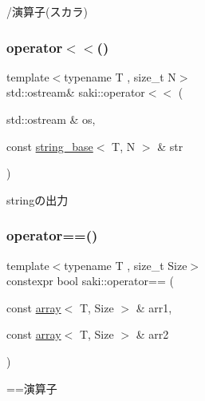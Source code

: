 /演算子(スカラ) 

\mbox{\label{namespacesaki_abf390d4e6c19fdb92d3a68afb7e71032}} 
\subsubsection{\texorpdfstring{operator$<$$<$()}{operator<<()}}
{\footnotesize\ttfamily template$<$typename T , size\+\_\+t N$>$ \\
std\+::ostream\& saki\+::operator$<$$<$ (\begin{DoxyParamCaption}\item[{std\+::ostream \&}]{os,  }\item[{const \mbox{\hyperlink{classsaki_1_1string__base}{string\+\_\+base}}$<$ T, N $>$ \&}]{str }\end{DoxyParamCaption})}



stringの出力 

\mbox{\label{namespacesaki_a5ce8a66ed6ece15fa9ddeaec2746374d}} 
\subsubsection{\texorpdfstring{operator==()}{operator==()}\hspace{0.1cm}{\footnotesize\ttfamily [1/11]}}
{\footnotesize\ttfamily template$<$typename T , size\+\_\+t Size$>$ \\
constexpr bool saki\+::operator== (\begin{DoxyParamCaption}\item[{const \mbox{\hyperlink{classsaki_1_1array}{array}}$<$ T, Size $>$ \&}]{arr1,  }\item[{const \mbox{\hyperlink{classsaki_1_1array}{array}}$<$ T, Size $>$ \&}]{arr2 }\end{DoxyParamCaption})}



==演算子 

\mbox{\label{namespacesaki_a57a23952c9becf92a51ff1742f645d66}} 
